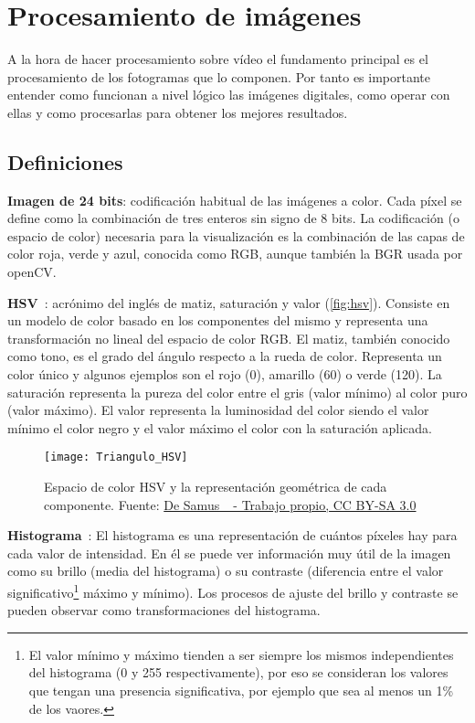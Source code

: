 \section{Procesamiento de imágenes}\label{sec:teccv}

A la hora de hacer procesamiento sobre vídeo el fundamento principal es el procesamiento de los fotogramas que lo componen. Por tanto es importante entender como funcionan a nivel lógico las imágenes digitales, como operar con ellas y como procesarlas para obtener los mejores resultados.

\subsection{Definiciones}

\textbf{Imagen de 24 bits}: codificación habitual de las imágenes a color. Cada píxel se define como la combinación de tres enteros sin signo de 8 bits. La codificación (o espacio de color) necesaria para la visualización es la combinación de las capas de color roja, verde y azul, conocida como RGB, aunque también la BGR usada por openCV. 

\textbf{HSV}~\cite{wiki:hsv}: acrónimo del inglés de matiz, saturación y valor (\autoref{fig:hsv}). Consiste en un modelo de color basado en los componentes del mismo y representa una transformación no lineal del espacio de color RGB. El matiz, también conocido como tono, es el grado del ángulo respecto a la rueda de color. Representa un color único y algunos ejemplos son el rojo (0\grado), amarillo (60\grado) o verde (120\grado). La saturación representa la pureza del color entre el gris (valor mínimo) al color puro (valor máximo). El valor representa la luminosidad del color siendo el valor mínimo el color negro y el valor máximo el color con la saturación aplicada.

\begin{figure}
	\centering
	\texttt{[image: Triangulo\_HSV]}
	\caption[Espacio de color HSV y la representación geométrica de cada componente.]{Espacio de color HSV y la representación geométrica de cada componente. Fuente: \href{https://commons.wikimedia.org/w/index.php?curid=1302915}{De Samus\_ - Trabajo propio, CC BY-SA 3.0}}
	\label{fig:hsv}
\end{figure}

\textbf{Histograma}~\cite{garrido2019opencv}: El histograma es una representación de cuántos píxeles hay para cada valor de intensidad. En él se puede ver información muy útil de la imagen como su brillo (media del histograma) o su contraste (diferencia entre el valor significativo\footnote{El valor mínimo y máximo tienden a ser siempre los mismos independientes del histograma (0 y 255 respectivamente), por eso se consideran los valores que tengan una presencia significativa, por ejemplo que sea al menos un 1\% de los vaores.} máximo y mínimo). Los procesos de ajuste del brillo y contraste se pueden observar como transformaciones del histograma.

